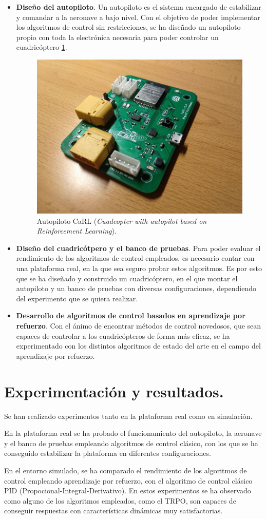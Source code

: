\begin{itemize}
	\item \textbf{Diseño del autopiloto}. Un autopiloto es el sistema encargado de estabilizar y comandar a la aeronave a bajo nivel. Con el objetivo de poder implementar los algoritmos de control sin restricciones, se ha diseñado un autopiloto propio con toda la electrónica necesaria para poder controlar un cuadricóptero \cref{hardware:carl_board}.  

\begin{figure}[htb!]
	\centering
	\includegraphics[width=0.\textwidth]{hardware/carl_board}
	\caption{Autopiloto CaRL (\textit{Cuadcopter with autopilot based on Reinforcement Learning}).}
	\label{hardware:carl_board}	
\end{figure}
	
	\item \textbf{Diseño del cuadricótpero y el banco de pruebas}. Para poder evaluar el rendimiento de los algoritmos de control empleados, es necesario contar con una plataforma real, en la que sea seguro probar estos algoritmos. Es por esto que se ha diseñado y construido un cuadricóptero, en el que montar el autopiloto y un banco de pruebas con diversas configuraciones, dependiendo del experimento que se quiera realizar.
	
	
	\item \textbf{Desarrollo de algoritmos de control basados en aprendizaje por refuerzo}. Con el ánimo de encontrar métodos de control novedosos, que sean capaces de controlar a los cuadricópteros de forma más eficaz, se ha experimentado con los distintos algoritmos de estado del arte en el campo del aprendizaje por refuerzo.
	
\end{itemize}


\section*{Experimentación y resultados.}
Se han realizado experimentos tanto en la plataforma real como en simulación.

En la plataforma real se ha probado el funcionamiento del autopiloto, la aeronave y el banco de pruebas empleando algoritmos de control clásico, con los que se ha conseguido estabilizar la plataforma en diferentes configuraciones.

En el entorno simulado, se ha comparado el rendimiento de los algoritmos de control empleando aprendizaje por refuerzo, con el algoritmo de control clásico PID (Propocional-Integral-Derivativo). En estos experimentos se ha observado como alguno de los algoritmos empleados, como el TRPO, son capaces de conseguir respuestas con características dinámicas muy satisfactorias. 

